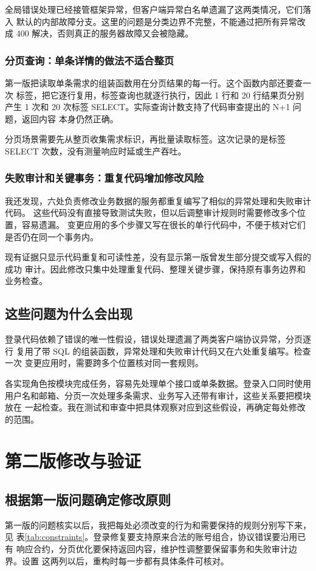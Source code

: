 \documentclass[UTF8,a4paper,12pt]{ctexart}
\newcommand{\chapterbreak}{\par\bigskip}
\begin{document}
全局错误处理已经接管框架异常，但客户端异常白名单遗漏了这两类情况，它们落入
默认的内部故障分支。这里的问题是分类边界不完整，不能通过把所有异常改成 400
解决，否则真正的服务器故障又会被隐藏。

\subsubsection{分页查询：单条详情的做法不适合整页}
第一版把读取单条需求的组装函数用在分页结果的每一行。这个函数内部还要查一次
标签，把它逐行复用，标签查询也就逐行执行，因此 1 行和 20 行结果页分别产生
1 次和 20 次标签 SELECT。实际查询计数支持了代码审查提出的 N+1 问题，返回内容
本身仍然正确。

分页场景需要先从整页收集需求标识，再批量读取标签。这次记录的是标签 SELECT
次数，没有测量响应时延或生产吞吐。

\subsubsection{失败审计和关键事务：重复代码增加修改风险}
我还发现，六处负责修改业务数据的服务都重复编写了相似的异常处理和失败审计代码。
这些代码没有直接导致测试失败，但以后调整审计规则时需要修改多个位置，容易遗漏。
变更应用的多个步骤又写在很长的单行代码中，不便于核对它们是否仍在同一个事务内。

现有证据只显示代码重复和可读性差，没有显示第一版曾发生部分提交或写入假的成功
审计。因此修改只集中处理重复代码、整理关键步骤，保持原有事务边界和业务检查。

\subsection{这些问题为什么会出现}
登录代码依赖了错误的唯一性假设，错误处理遗漏了两类客户端协议异常，分页逐行
复用了带 SQL 的组装函数，异常处理和失败审计代码又在六处重复编写。检查一次
变更应用时，需要跨多个位置核对同一套规则。

各实现角色按模块完成任务，容易先处理单个接口或单条数据。登录入口同时使用
用户名和邮箱、分页一次处理多条需求、业务写入还带有审计，这些关系要把模块放在
一起检查。我在测试和审查中把具体观察对应到这些假设，再确定每处修改的范围。

\chapterbreak
\section{第二版修改与验证}
\subsection{根据第一版问题确定修改原则}
第一版的问题核实以后，我把每处必须改变的行为和需要保持的规则分别写下来，见
表\ref{tab:constraints}。登录修复要支持原来合法的账号组合，协议错误要沿用已有
响应合约，分页优化要保持返回内容，维护性调整要保留事务和失败审计边界。设置
这两列以后，重构时每一步都有具体条件可核对。
\end{document}
